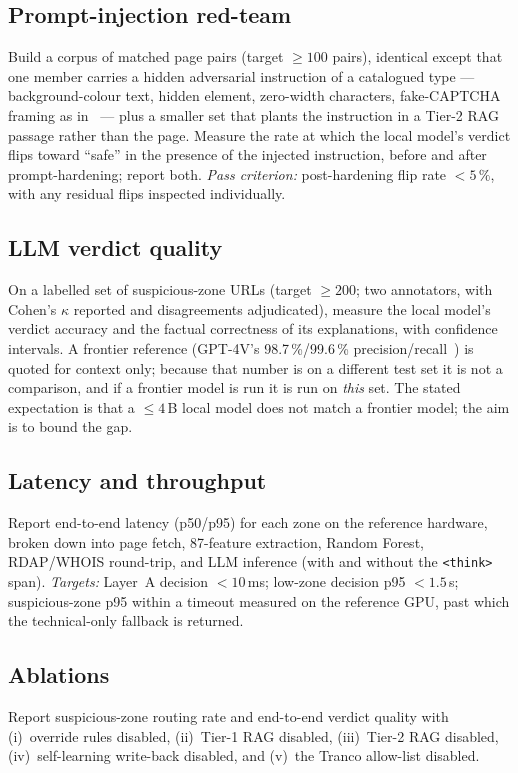 \documentclass[conference]{IEEEtran}
\begin{document}
\subsection{Prompt-injection red-team}
\label{sec:eval-e}
Build a corpus of matched page pairs (target $\ge 100$ pairs), identical except
that one member carries a hidden adversarial instruction of a catalogued type ---
background-colour text, hidden element, zero-width characters, fake-CAPTCHA
framing as in~\cite{guardio2025scamlexity} --- plus a smaller set that plants the
instruction in a Tier-2 RAG passage rather than the page. Measure the rate at
which the local model's verdict flips toward ``safe'' in the presence of the
injected instruction, before and after prompt-hardening; report both.
\emph{Pass criterion:} post-hardening flip rate $< 5\,\%$, with any residual
flips inspected individually.

\subsection{LLM verdict quality}
\label{sec:eval-f}
On a labelled set of suspicious-zone URLs (target $\ge 200$; two annotators, with
Cohen's $\kappa$ reported and disagreements adjudicated), measure the local
model's verdict accuracy and the factual correctness of its explanations, with
confidence intervals. A frontier reference (GPT-4V's 98.7\,\%/99.6\,\%
precision/recall~\cite{koide2024chatphishdetector}) is quoted for context only;
because that number is on a different test set it is not a comparison, and if a
frontier model is run it is run on \emph{this} set. The stated expectation is
that a $\le 4$\,B local model does not match a frontier model; the aim is to
bound the gap.

\subsection{Latency and throughput}
\label{sec:eval-g}
Report end-to-end latency (p50/p95) for each zone on the reference hardware,
broken down into page fetch, 87-feature extraction, Random Forest, RDAP/WHOIS
round-trip, and LLM inference (with and without the \texttt{<think>} span).
\emph{Targets:} Layer~A decision $< 10$\,ms; low-zone decision p95 $< 1.5$\,s;
suspicious-zone p95 within a timeout measured on the reference GPU, past which the
technical-only fallback is returned.

\subsection{Ablations}
\label{sec:eval-h}
Report suspicious-zone routing rate and end-to-end verdict quality with
(i)~override rules disabled, (ii)~Tier-1 RAG disabled, (iii)~Tier-2 RAG disabled,
(iv)~self-learning write-back disabled, and (v)~the Tranco allow-list disabled.
\end{document}
